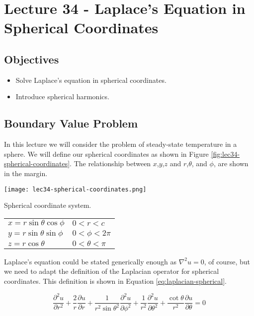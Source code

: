 \chapter{Lecture 34 - Laplace's Equation in Spherical Coordinates}
\label{ch:lec34}
\section{Objectives}
\begin{itemize}
\item Solve Laplace's equation in spherical coordinates. 
\item Introduce spherical harmonics.
\end{itemize}
\setcounter{lstannotation}{0}

\section{Boundary Value Problem}

In this lecture we will consider the problem of steady-state temperature in a sphere.  We will define our spherical coordinates as shown in Figure \ref{fig:lec34-spherical-coordinates}.  The relationship between $x$,$y$,$z$ and $r$,$\theta$, and $\phi$, are shown in the margin.
\begin{marginfigure}
\texttt{[image: lec34-spherical-coordinates.png]}
\caption{Spherical coordinate system.}
\label{fig:lec34-spherical-coordinates}
\end{marginfigure}
\begin{margintable}
\begin{tabular}{l l}
$x = r\sin{\theta}\cos{\phi}$ & $0<r<c$ \\
$y = r\sin{\theta}\sin{\phi}$ & $0< \phi < 2\pi$ \\
$z = r\cos{\theta}$ & $0 < \theta < \pi$ \\
\end{tabular}
\end{margintable}

Laplace's equation could be stated generically enough as $\nabla^2u = 0$, of course, but we need to adapt the definition of the Laplacian operator for spherical coordinates.  This definition is shown in Equation \ref{eq:laplacian-spherical}.

\begin{equation}
\frac{\partial^2 u}{\partial r^2} + \frac{2}{r}\frac{\partial u}{\partial r} + \frac{1}{r^2 \sin{\theta}^2} \frac{\partial^2 u}{\partial \phi^2} + \frac{1}{r^2}\frac{\partial^2 u}{\partial \theta^2} + \frac{\cot{\theta}}{r^2}\frac{\partial u}{\partial \theta} = 0
\label{eq:laplacian-spherical}
\end{equation}

